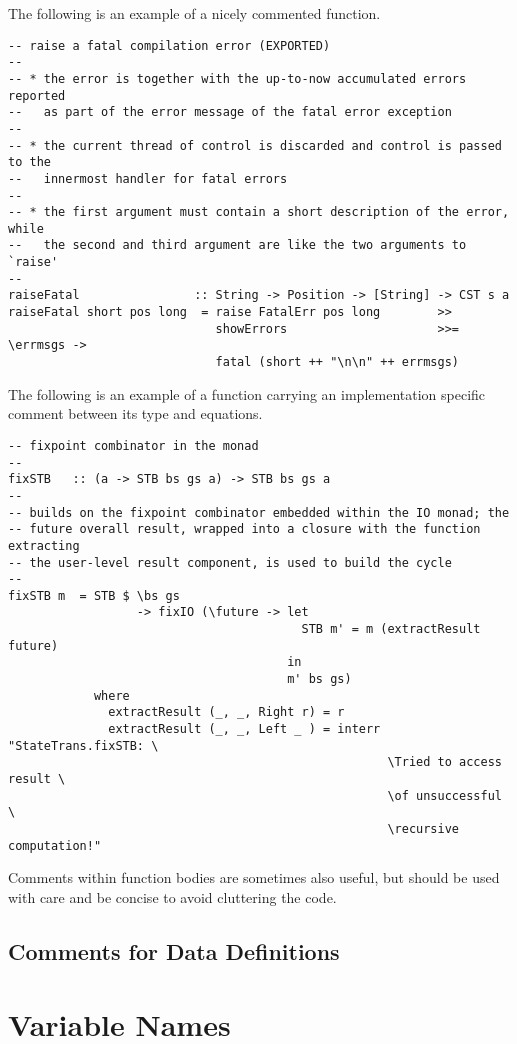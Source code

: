 \documentclass{report}
\begin{document}
The following is an example of a nicely commented function.
%
\begin{verbatim}
-- raise a fatal compilation error (EXPORTED)
--
-- * the error is together with the up-to-now accumulated errors reported
--   as part of the error message of the fatal error exception
--
-- * the current thread of control is discarded and control is passed to the
--   innermost handler for fatal errors
--
-- * the first argument must contain a short description of the error, while
--   the second and third argument are like the two arguments to `raise'
--
raiseFatal                :: String -> Position -> [String] -> CST s a
raiseFatal short pos long  = raise FatalErr pos long        >>
                             showErrors                     >>= \errmsgs ->
                             fatal (short ++ "\n\n" ++ errmsgs)
\end{verbatim}
%
The following is an example of a function carrying an implementation specific
comment between its type and equations.
%
\begin{verbatim}
-- fixpoint combinator in the monad
--
fixSTB   :: (a -> STB bs gs a) -> STB bs gs a
--
-- builds on the fixpoint combinator embedded within the IO monad; the
-- future overall result, wrapped into a closure with the function extracting
-- the user-level result component, is used to build the cycle
--
fixSTB m  = STB $ \bs gs 
                  -> fixIO (\future -> let 
                                         STB m' = m (extractResult future) 
                                       in 
                                       m' bs gs)
            where
              extractResult (_, _, Right r) = r
              extractResult (_, _, Left _ ) = interr "StateTrans.fixSTB: \
                                                     \Tried to access result \
                                                     \of unsuccessful \
                                                     \recursive computation!"
\end{verbatim}

Comments within function bodies are sometimes also useful, but should be used
with care and be concise to avoid cluttering the code.

\subsection{Comments for Data Definitions}


\section{Variable Names}
\end{document}
